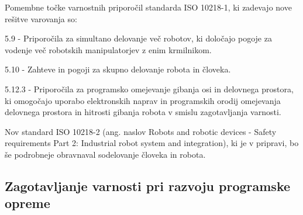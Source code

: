 \vspace{5mm}

Pomembne točke varnostnih priporočil standarda ISO 10218-1, ki
zadevajo nove rešitve varovanja so:
\begin{description}
    \item \vspace*{-0.1cm}5.9 - Priporočila za simultano delovanje več robotov,
    ki določajo pogoje za vodenje več robotskih manipulatorjev z enim krmilnikom.
    \item \vspace*{-0.1cm}5.10 - Zahteve in pogoji za skupno delovanje robota in človeka.
    \item \vspace*{-0.1cm}5.12.3 - Priporočila za programsko omejevanje gibanja
    osi in delovnega prostora, ki omogočajo uporabo elektronskih naprav in programskih
    orodij omejevanja delovnega prostora in hitrosti gibanja robota v smislu zagotavljanja varnosti.
\end{description}
Nov standard ISO 10218-2 (ang. naslov Robots and robotic devices -
Safety requirements Part 2: Industrial robot system and
integration), ki je v pripravi, bo še podrobneje obravnaval
sodelovanje človeka in robota.

\vspace{10mm}

\subsection{Zagotavljanje varnosti pri razvoju programske opreme}

\vspace{5mm}

